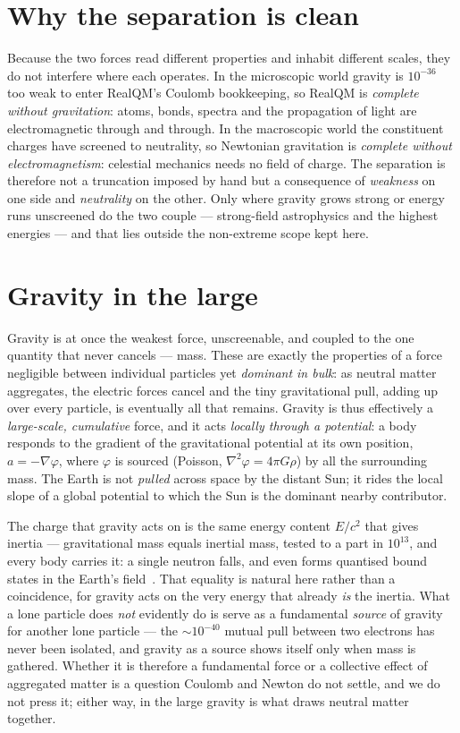 \documentclass[11pt]{article}
\begin{document}
\section{Why the separation is clean}
Because the two forces read different properties and inhabit different scales, they do not interfere where each
operates. In the microscopic world gravity is $10^{-36}$ too weak to enter RealQM's Coulomb bookkeeping, so RealQM
is \emph{complete without gravitation}: atoms, bonds, spectra and the propagation of light are electromagnetic
through and through. In the macroscopic world the constituent charges have screened to neutrality, so Newtonian
gravitation is \emph{complete without electromagnetism}: celestial mechanics needs no field of charge. The
separation is therefore not a truncation imposed by hand but a consequence of \emph{weakness} on one side and
\emph{neutrality} on the other. Only where gravity grows strong or energy runs unscreened do the two couple ---
strong-field astrophysics and the highest energies --- and that lies outside the non-extreme scope kept here.

\section{Gravity in the large}
Gravity is at once the weakest force, unscreenable, and coupled to the one quantity that never cancels --- mass.
These are exactly the properties of a force negligible between individual particles yet \emph{dominant in bulk}: as
neutral matter aggregates, the electric forces cancel and the tiny gravitational pull, adding up over every
particle, is eventually all that remains. Gravity is thus effectively a \emph{large-scale, cumulative} force, and
it acts \emph{locally through a potential}: a body responds to the gradient of the gravitational potential at its
own position, $a=-\nabla\varphi$, where $\varphi$ is sourced (Poisson, $\nabla^2\varphi=4\pi G\rho$) by all the
surrounding mass. The Earth is not \emph{pulled} across space by the distant Sun; it rides the local slope of a
global potential to which the Sun is the dominant nearby contributor.

The charge that gravity acts on is the same energy content $E/c^2$ that gives inertia --- gravitational mass equals
inertial mass, tested to a part in $10^{13}$, and every body carries it: a single neutron falls, and even forms
quantised bound states in the Earth's field~\cite{Nesvizhevsky}. That equality is natural here rather than a
coincidence, for gravity acts on the very energy that already \emph{is} the inertia. What a lone particle does
\emph{not} evidently do is serve as a fundamental \emph{source} of gravity for another lone particle --- the
$\sim10^{-40}$ mutual pull between two electrons has never been isolated, and gravity as a source shows itself only
when mass is gathered. Whether it is therefore a fundamental force or a collective effect of aggregated matter is a
question Coulomb and Newton do not settle, and we do not press it; either way, in the large gravity is what draws
neutral matter together.
\end{document}
